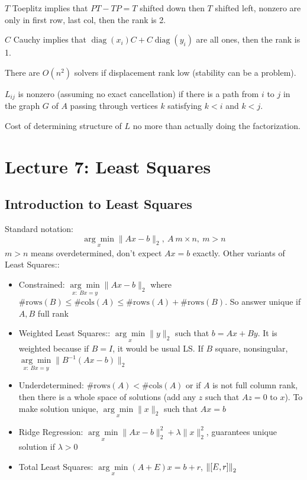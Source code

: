 \documentclass[11pt]{article}
\numberwithin{equation}{section}
\begin{document}
\begin{example}
    $T$ Toeplitz implies that $PT - TP = T$ shifted down then $T$ shifted left,
    nonzero are only in first row, last col, then the rank is 2.
\end{example}

\begin{example}
    $C$ Cauchy implies that $\operatorname{diag}(x_i) C + C\operatorname{diag}(y_i)$ are all ones, then the rank is 1.     
\end{example}

\begin{theorem}[Kailath et al.]
    There are $O(n^2)$ solvers if displacement rank low (stability can be a problem).
\end{theorem}

\begin{theorem}
    $L_{ij}$ is nonzero (assuming no exact cancellation) if there is a path from $i$ to $j$ in the graph $G$ of $A$ passing through vertices $k$ satisfying $k < i$ and $k < j$.
\end{theorem}

\begin{theorem}
    Cost of determining structure of $L$ no more than actually doing the factorization.
\end{theorem}

\newpage
\section{Lecture 7: Least Squares}
\subsection{Introduction to Least Squares}
Standard notation:
 $$ \underset{x}{\arg\min} \| Ax-b \|_2, \ A \ m \times n, \ m > n $$
 $m > n$ means overdetermined, don't expect $Ax=b$ exactly. 
 Other variants of Least Squares::
 \begin{itemize}
     \item Constrained: $ \underset{x: \ Bx=y}{\arg\min} \| Ax-b \|_2$ where $\#\mathrm{rows}(B) \leq \#\mathrm{cols}(A) \leq \#\mathrm{rows}(A) + \#\mathrm{rows}(B)$. So answer unique if $A,B$ full rank
     \item Weighted Least Squares:: $ \underset{x}{\arg\min} \| y \|_2$ such that $b=A x+B y$. It is weighted because if $B=I$, it would be usual LS. If $B$ square, nonsingular, $ \underset{x: \ Bx=y}{\arg\min} \| B^{-1}(Ax-b) \|_2 $
     \item Underdetermined: $\#\mathrm{rows}(A) < \#\mathrm{cols}(A)$ or if $A$ is not full column rank, then there is a whole space of solutions (add any $z$ such that $Az=0$ to $x$). To make solution unique, $\underset{x}{\arg\min} \| x \|_2$
     such that $Ax=b$
     \item Ridge Regression: $\underset{x}{\arg\min} \| Ax-b \|_2^2 + \lambda \| x \|_2^2$, guarantees unique solution if $\lambda >0$
     \item Total Least Squares: $\underset{x}{\arg\min}(A+E)x = b + r$, $\left\| [E, r] \right\|_2$
 \end{itemize}
\end{document}
